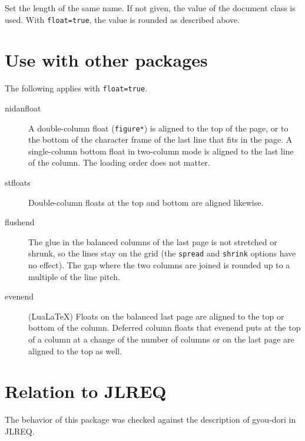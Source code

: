 \documentclass[paper=a4,dvipdfmx]{jlreq}
\newcommand\pkg[1]{\textsf{#1}}
\newcommand\opt[1]{\texttt{#1}}
\newcommand\env[1]{\texttt{#1}}
\begin{document}
Set the length of the same name. If not given, the value of the document class
is used. With \opt{float=true}, the value is rounded as described above.

\section{Use with other packages}

The following applies with \opt{float=true}.
\begin{description}
\item[\pkg{nidanfloat}] A double-column float (\env{figure*}) is aligned to the
  top of the page, or to the bottom of the character frame of the last line
  that fits in the page. A single-column bottom float in two-column mode is
  aligned to the last line of the column. The loading order does not matter.
\item[\pkg{stfloats}] Double-column floats at the top and bottom are aligned
  likewise.
\item[\pkg{flushend}] The glue in the balanced columns of the last page is not
  stretched or shrunk, so the lines stay on the grid (the \opt{spread} and
  \opt{shrink} options have no effect). The gap where the two columns are joined
  is rounded up to a multiple of the line pitch.
\item[\pkg{evenend}] (LuaLaTeX) Floats on the balanced last page are aligned to
  the top or bottom of the column. Deferred column floats that evenend puts at the
  top of a column at a change of the number of columns or on the last page are
  aligned to the top as well.
\end{description}

\section{Relation to JLREQ}

The behavior of this package was checked against the description of gyou-dori
in JLREQ.
\end{document}
